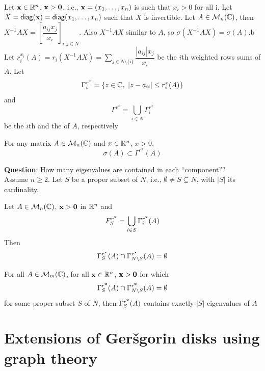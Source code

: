 \documentclass[aspectratio=169]{beamer}
\begin{document}
\begin{frame}
Let $\mathbf{x} \in \mathbb{R}^n$, $\bx>\b0$, i.e., $\mathbf{x}= (x_1, \ldots, x_n)$ is such that $x_i>0$ for all i. Let $X= \mathsf{diag}(\mathbf{x})= \mathsf{diag}(x_1, \ldots, x_n)$ such that $X$ is invertible. Let $A\in \mathcal{M}_n(\mathbb{C})$, then $X^{-1}AX= \left[ \dfrac{a_{ij}x_j}{x_i}\right]_{i,j\in N}$. Also $X^{-1} AX$ similar to $A$, so $\sigma(X^{-1} AX) =\sigma(A).$b\\
Let $r_i^{x_i}(A)= r_i(X^{-1}AX)= \sum\limits_{j\in N\setminus \{i\}} \dfrac{| a_{ij}| x_j}{x_i}$ be the $i$th weighted rows sums of $A$. Let 
\[\Gamma_i^{r^x} =\{ z\in \mathbb{C}, \, \, | z -a_{ii}| \leq r_i^x(A)\}\]
and 
\[\Gamma^{r^x}= \bigcup\limits_{i\in N} \Gamma_i^{r^x}\]
be the $i$th  and the of $A$, respectively
\end{frame}


\begin{frame}
\begin{corollary}\label{coro:weighted_Gershgorin_disks}
For any matrix $A\in \mathcal{M}_n(\mathbb{C})$ and $x\in \mathbb{R}^n$, $x>0$, 
\[\sigma(A)\subset \Gamma^{r^x}(A)\]
\end{corollary}

\textbf{Question}: How many eigenvalues are contained in each ``component''?\\
Assume $n\geq 2$. Let $S$ be a proper subset of $N$, i.e., $\emptyset\neq S \subsetneq N$, with $|S|$ its cardinality.
\end{frame}


\begin{frame}
Let $A\in \mathcal{M}_n(\mathbb{C})$, $\bx>\b0$ in $\mathbb{R}^n$ and 
\[
  F_S^{r^{\mathbf{x}}}= \bigcup\limits_{i\in S} \Gamma_i^{r^{\mathbf{x}}}(A)
\]
Then 
\[
  \Gamma_S^{r^{\mathbf{x}}}(A) \cap \Gamma_{N\setminus S}^{r^{\mathbf{x}}}(A)= \emptyset
\]

\begin{theorem}
For all $A\in \mathcal{M}_{m}(\mathbb{C})$, for all $ \mathbf{x}\in \mathbb{R}^n $, $\bx>\b0$ for which 
\[
  \Gamma_S^{r^{\mathbf{x}}}(A) \cap \Gamma_{N\setminus S}^{r^{\mathbf{x}}}(A)= \emptyset
\]
for some proper subset $S$ of $N$, then $\Gamma_S^{r^{\mathbf{x}}}(A)$ contains exactly $|S| $ eigenvalues of $A$
\end{theorem}
\end{frame}
 

\section{Extensions of Ger\v{s}gorin disks using graph theory}
\end{document}
